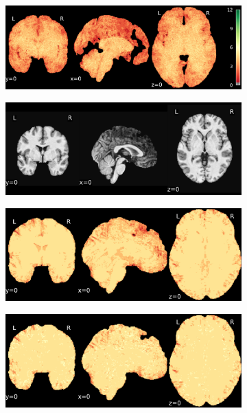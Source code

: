 \documentclass{article}
\begin{document}
\begin{landscape}
\begin{figure}
\begin{subfigure}[t]{0.2\paperheight}
        \end{subfigure}
        \begin{subfigure}[t]{0.2\paperheight}
            \centering
            \includegraphics[width=\textwidth]{figures/sig/ds000256_sub-CTS210_rr.rs_sig.pdf}
        \end{subfigure}
        \begin{subfigure}[t]{0.2\paperheight}
            \centering
            \includegraphics[width=\textwidth]{figures/ieee_T1/ds001748_sub-adult15_ieee_mean.pdf}
        \end{subfigure}
        \begin{subfigure}[t]{0.2\paperheight}
            \centering
            \includegraphics[width=\textwidth]{figures/sig/ds001748_sub-adult15_rr_sig.pdf}
        \end{subfigure}
        \begin{subfigure}[t]{0.2\paperheight}
            \centering
            \includegraphics[width=\textwidth]{figures/sig/ds001748_sub-adult15_rs_sig.pdf}

\end{subfigure}
\end{figure}
\end{landscape}
\end{document}
